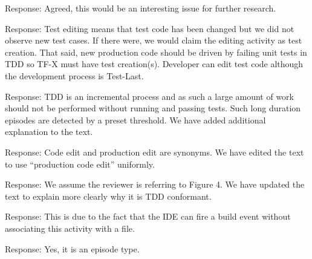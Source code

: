 \documentclass[11pt]{article}
\begin{document}

\noindent Response: Agreed, this would be an interesting issue for further research.


\noindent Response: Test editing means that test code has been changed but
we did not observe new test cases. If there were, we would claim the
editing activity as test creation.  That said, new production code should
be driven by failing unit tests in TDD so TF-X must have test
creation(s). Developer can edit test code although the development process
is Test-Last.


\noindent Response: TDD is an incremental process and as such a large amount of work should not be performed without running and passing tests. Such long duration episodes are detected by a preset threshold. We have added additional explanation to the text.



\noindent Response: Code edit and production edit are synonyms. We have edited the text to use ``production code edit'' uniformly. 



\noindent Response: We assume the reviewer is referring to Figure 4. We have updated the text to explain more clearly why it is TDD conformant.


\noindent Response: This is due to the fact that the IDE can fire a build event without associating this activity with a file. 


\noindent Response: Yes, it is an episode type. 
\end{document}
